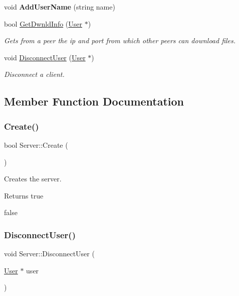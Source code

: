\begin{DoxyCompactItemize}
\mbox{\label{class_server_adf27e4b48c7b39488ec41eb9e6697a68}} 
void {\bfseries Add\+User\+Name} (string name)
\item 
bool \mbox{\hyperlink{class_server_a2529b191853b2e0915b1c99464c1c792}{Get\+Dwnld\+Info}} (\mbox{\hyperlink{class_user}{User}} $\ast$)
\begin{DoxyCompactList}\small\item\em Gets from a peer the ip and port from which other peers can download files. \end{DoxyCompactList}\item 
void \mbox{\hyperlink{class_server_ad195fd80fe64d0d438ae6b516ed3a51d}{Disconnect\+User}} (\mbox{\hyperlink{class_user}{User}} $\ast$)
\begin{DoxyCompactList}\small\item\em Disconnect a client. \end{DoxyCompactList}\end{DoxyCompactItemize}


\subsection{Member Function Documentation}
\mbox{\label{class_server_a8939cd9f717bb164399d1bc9f20a51a2}} 
\subsubsection{\texorpdfstring{Create()}{Create()}}
{\footnotesize\ttfamily bool Server\+::\+Create (\begin{DoxyParamCaption}{ }\end{DoxyParamCaption})}



Creates the server. 

\begin{DoxyReturn}{Returns}
true 

false 
\end{DoxyReturn}
\mbox{\label{class_server_ad195fd80fe64d0d438ae6b516ed3a51d}} 
\subsubsection{\texorpdfstring{Disconnect\+User()}{DisconnectUser()}}
{\footnotesize\ttfamily void Server\+::\+Disconnect\+User (\begin{DoxyParamCaption}\item[{\mbox{\hyperlink{class_user}{User}} $\ast$}]{user }\end{DoxyParamCaption})}



